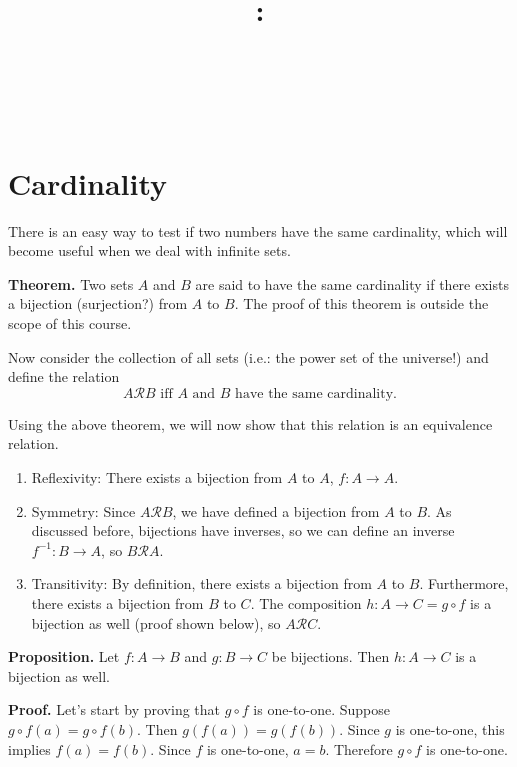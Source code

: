 \documentclass{article}
\title{
    \vspace{2in}
    \textbf{\lectClass:\\ \lectTitle}\\
    \vspace{0.1in}\large{\textit{\lectClassInstructor\ \lectSection}}
    \vspace{3in}
    \author{\textbf{\lectAuthorName}}
    \date{}
}
\begin{document}
\maketitle
\pagebreak

\section*{Cardinality}
    
    There is an easy way to test if two numbers have the same cardinality, which will become useful when we deal with infinite sets.
    
    \vspace{1.5mm}
    \textbf{Theorem.} Two sets $A$ and $B$ are said to have the same cardinality if there exists a bijection (surjection?) from $A$ to $B$. The proof of this theorem is outside the scope of this course.
    
    \vspace{1.5mm}
    Now consider the collection of all sets (i.e.: the power set of the universe!) and define the relation
    $$A \mathcal{R }B \text{ iff $A$ and $B$ have the same cardinality.}$$
    
    Using the above theorem, we will now show that this relation is an equivalence relation.
    
    \begin{enumerate}[label = \arabic*.]
        \item Reflexivity: There exists a bijection from $A$ to $A$, $f: A \rightarrow A$.
        \item Symmetry: Since $A\mathcal{R}B$, we have defined a bijection from $A$ to $B$. As discussed before, bijections have inverses, so we can define an inverse $f^{-1}: B \rightarrow A$, so $B \mathcal{R} A$.
        \item Transitivity: By definition, there exists a bijection from $A$ to $B$. Furthermore, there exists a bijection from $B$ to $C$. The composition $h: A \rightarrow C = g \circ f$ is a bijection as well (proof shown below), so $A \mathcal{R} C$.
    \end{enumerate}
    
    \vspace{3mm}
    \textbf{Proposition.}
    Let $f: A \rightarrow B$ and $g: B \rightarrow C$ be bijections. Then $h: A \rightarrow C$ is a bijection as well.
    
    \vspace{1.5mm}
    \textbf{Proof.}
    Let’s start by proving that $g \circ f$ is one-to-one. Suppose $g \circ f(a) = g \circ f(b)$. Then $g(f(a)) = g(f(b))$. Since $g$ is one-to-one, this implies $f(a) = f(b)$. Since $f$ is one-to-one, $a = b$. Therefore $g \circ f$ is one-to-one. 
    \vspace{1.5mm}
    
\end{document}
